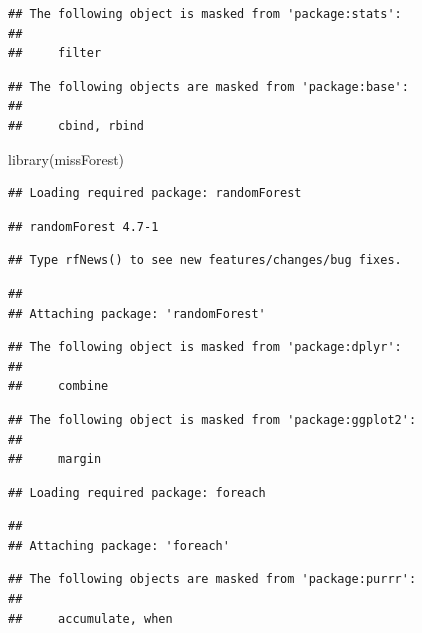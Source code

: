 \documentclass[
]{book}
\newenvironment{Shaded}{\begin{snugshade}}{\end{snugshade}}
\newcommand{\FunctionTok}[1]{\textcolor[rgb]{0.00,0.00,0.00}{#1}}
\newcommand{\NormalTok}[1]{#1}
\begin{document}
\begin{verbatim}
## The following object is masked from 'package:stats':
## 
##     filter
\end{verbatim}

\begin{verbatim}
## The following objects are masked from 'package:base':
## 
##     cbind, rbind
\end{verbatim}

\begin{Shaded}
\begin{Highlighting}[]
\FunctionTok{library}\NormalTok{(missForest)}
\end{Highlighting}
\end{Shaded}

\begin{verbatim}
## Loading required package: randomForest
\end{verbatim}

\begin{verbatim}
## randomForest 4.7-1
\end{verbatim}

\begin{verbatim}
## Type rfNews() to see new features/changes/bug fixes.
\end{verbatim}

\begin{verbatim}
## 
## Attaching package: 'randomForest'
\end{verbatim}

\begin{verbatim}
## The following object is masked from 'package:dplyr':
## 
##     combine
\end{verbatim}

\begin{verbatim}
## The following object is masked from 'package:ggplot2':
## 
##     margin
\end{verbatim}

\begin{verbatim}
## Loading required package: foreach
\end{verbatim}

\begin{verbatim}
## 
## Attaching package: 'foreach'
\end{verbatim}

\begin{verbatim}
## The following objects are masked from 'package:purrr':
## 
##     accumulate, when
\end{verbatim}
\end{document}
